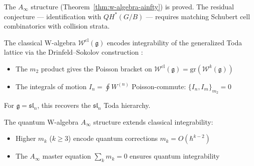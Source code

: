 \begin{remark}[Scope]
The $A_\infty$ structure (Theorem~\ref{thm:w-algebra-ainfty}) is proved.
The residual conjecture --- identification with $QH^*(G/B)$ --- requires matching Schubert cell combinatorics with collision strata.
\end{remark}
 
\begin{theorem}\label{thm:w-classical-integrability}
The classical W-algebra $\mathcal{W}^{\mathrm{cl}}(\mathfrak{g})$ encodes integrability of the generalized Toda lattice via the Drinfeld--Sokolov construction \cite{DS}:
\begin{itemize}
\item The $m_2$ product gives the Poisson bracket on $\mathcal{W}^{\mathrm{cl}}(\mathfrak{g}) = \mathrm{gr}(\mathcal{W}^k(\mathfrak{g}))$
\item The integrals of motion $I_n = \oint W^{(n)}$ Poisson-commute: $\{I_n, I_m\}_{m_2} = 0$
\end{itemize}
For $\mathfrak{g} = \mathfrak{sl}_n$, this recovers the $\mathfrak{sl}_n$ Toda hierarchy.
\end{theorem}

\begin{theorem}\label{thm:w-integrability}
The quantum W-algebra $A_\infty$ structure extends classical integrability:
\begin{itemize}
\item Higher $m_k$ ($k \geq 3$) encode quantum corrections $m_k = O(\hbar^{k-2})$
\item The $A_\infty$ master equation $\sum_k m_k = 0$ ensures quantum integrability
\end{itemize}
\end{theorem}

